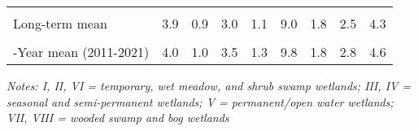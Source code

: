\documentclass[
  12pt,
]{article}
\begin{document}
\begin{table}[!h]
{\begin{threeparttable}
\begin{tabular}[t]{>{\centering\arraybackslash}m{8em}cccccccc}
\cellcolor{gray!6}{\% Change from previous year} & \cellcolor{gray!6}{-62.6\%} & \cellcolor{gray!6}{-57.1\%} & \cellcolor{gray!6}{7.5\%} & \cellcolor{gray!6}{-23.0\%} & \cellcolor{gray!6}{-37.1\%} & \cellcolor{gray!6}{70.6\%} & \cellcolor{gray!6}{-26.5\%} & \cellcolor{gray!6}{1.5\%}\\
Long-term mean & 3.9 & 0.9 & 3.0 & 1.1 & 9.0 & 1.8 & 2.5 & 4.3\\
\cellcolor{gray!6}{\% Change from long-term mean} & \cellcolor{gray!6}{-25.3\%} & \cellcolor{gray!6}{-1.5\%} & \cellcolor{gray!6}{66.3\%} & \cellcolor{gray!6}{58.1\%} & \cellcolor{gray!6}{18.5\%} & \cellcolor{gray!6}{49.8\%} & \cellcolor{gray!6}{12.0\%} & \cellcolor{gray!6}{27.7\%}\\
10-Year mean (2011-2021) & 4.0 & 1.0 & 3.5 & 1.3 & 9.8 & 1.8 & 2.8 & 4.6\\
\bottomrule
\end{tabular}
\begin{tablenotes}
\small
\item \textit{Notes: I, II, VI = temporary, wet meadow, and shrub swamp
    wetlands; III, IV = seasonal and semi-permanent wetlands; V =
    permanent/open water wetlands; VII, VIII = wooded swamp and bog wetlands} 
\item 
\end{tablenotes}
\end{threeparttable}}
\end{table}

\newpage
\end{document}
